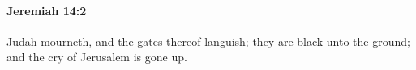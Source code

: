 
		\paragraph{Jeremiah 14:2} %
			\label{JEREMIAH-14-2}

			Judah mourneth, and the gates thereof languish; they are black unto the ground; and the cry of Jerusalem is gone up.


